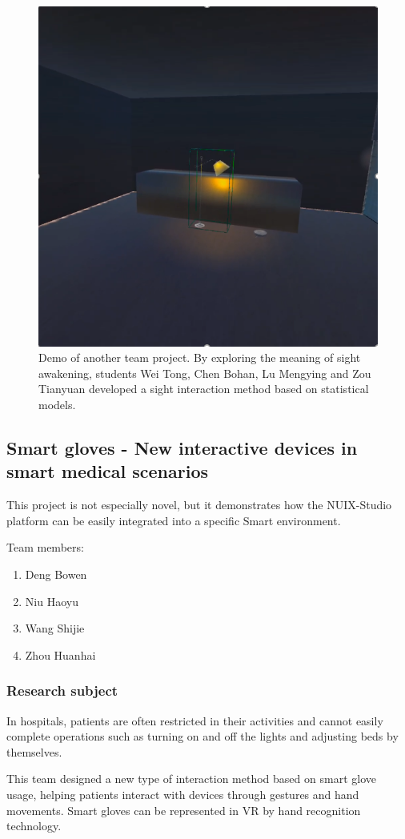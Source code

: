 \begin{figure}
  \centering
  \includegraphics[width=0.6\linewidth]{figures/Project_10.png}
  \caption{Demo of another team project. By exploring the meaning of sight awakening, students Wei Tong, Chen Bohan, Lu Mengying and Zou Tianyuan developed a sight interaction method based on statistical models. }
  \label{fig:Project10-figure}
\end{figure}

\subsection{Smart gloves - New interactive devices in smart medical scenarios}

This project is not especially novel, but it demonstrates how the NUIX-Studio platform can be easily integrated into a specific Smart environment.

Team members:
\begin{enumerate}
    \item Deng Bowen 
    \item Niu Haoyu
    \item Wang Shijie 
    \item Zhou Huanhai 
\end{enumerate}


\subsubsection{Research subject}

In hospitals, patients are often restricted in their activities and cannot easily complete operations such as turning on and off the lights and adjusting beds by themselves.

This team designed a new type of interaction method based on smart glove usage, helping patients interact with devices through gestures and hand movements. Smart gloves can be represented in VR by hand recognition technology.

